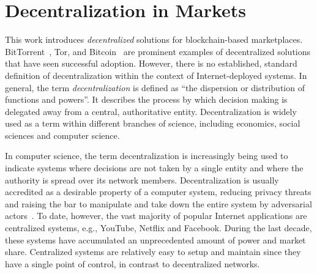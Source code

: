 \section{Decentralization in Markets}
\label{sec:decentralization}
This work introduces \emph{decentralized} solutions for blockchain-based marketplaces.
BitTorrent~\cite{pouwelse2005bittorrent}, Tor, and Bitcoin~\cite{nakamoto2008bitcoin} are prominent examples of decentralized solutions that have seen successful adoption.
However, there is no established, standard definition of decentralization within the context of Internet-deployed systems.
In general, the term \emph{decentralization} is defined as \enquote{the dispersion or distribution of functions and powers}.
It describes the process by which decision making is delegated away from a central, authoritative entity.
Decentralization is widely used as a term within different branches of science, including economics, social sciences and computer science.

In computer science, the term decentralization is increasingly being used to indicate systems where decisions are not taken by a single entity and where the authority is spread over its network members.
Decentralization is usually accredited as a desirable property of a computer system, reducing privacy threats and raising the bar to manipulate and take down the entire system by adversarial actors~\cite{troncoso2017systematizing}.
To date, however, the vast majority of popular Internet applications are centralized systems, e.g., YouTube, Netflix and Facebook.
During the last decade, these systems have accumulated an unprecedented amount of power and market share.
Centralized systems are relatively easy to setup and maintain since they have a single point of control, in contrast to decentralized networks.

